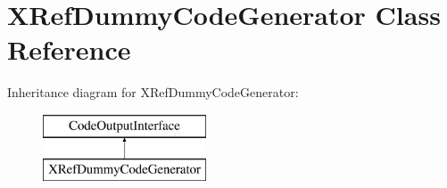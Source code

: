 \hypertarget{class_x_ref_dummy_code_generator}{}\section{X\+Ref\+Dummy\+Code\+Generator Class Reference}
\label{class_x_ref_dummy_code_generator}
Inheritance diagram for X\+Ref\+Dummy\+Code\+Generator\+:\begin{figure}[H]
\begin{center}
\leavevmode
\includegraphics[height=2.000000cm]{class_x_ref_dummy_code_generator}
\end{center}
\end{figure}
